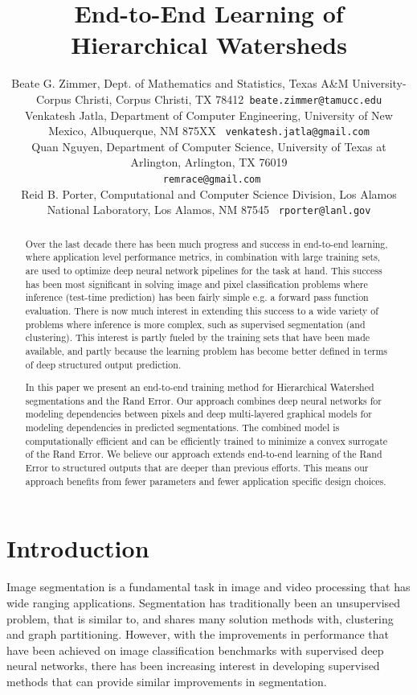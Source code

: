 \documentclass[letterpaper,twocolumn,fleqn]{article}
\title{End-to-End Learning of Hierarchical Watersheds}
\author{
 Beate G. Zimmer, Dept. of Mathematics and Statistics, Texas A\&M University-Corpus Christi, Corpus Christi, TX 78412\texttt{ beate.zimmer@tamucc.edu} \\
 Venkatesh Jatla, Department of Computer Engineering, University of New Mexico, Albuquerque, NM 875XX \texttt{ venkatesh.jatla@gmail.com} \\
 Quan Nguyen, Department of Computer Science, University of Texas at Arlington, Arlington, TX 76019 \\\texttt{ remrace@gmail.com} \\
 Reid B. Porter, Computational and Computer Science Division, Los Alamos National Laboratory, Los Alamos, NM 87545 \texttt{ rporter@lanl.gov}
  }
\date{} %
\begin{document}
 

\maketitle 

\thispagestyle{empty} %


\begin{abstract}

Over the last decade there has been much progress and success in end-to-end learning, where application level performance metrics, in combination with large training sets, are used to optimize deep neural network pipelines for the task at hand. This success has been most significant in solving image and pixel classification problems where inference (test-time prediction) has been fairly simple e.g. a forward pass function evaluation. There is now much interest  in extending this success to a wide variety of problems where inference is more complex, such as supervised segmentation (and clustering). This interest is partly fueled by the training sets that have been made available, and partly because the learning problem has become better defined in terms of deep structured output prediction. 

In this paper we present an end-to-end training method for Hierarchical Watershed segmentations and the Rand Error. Our approach combines deep neural networks for modeling dependencies between pixels and deep multi-layered graphical models for modeling dependencies in predicted segmentations. The combined model is computationally efficient and can be efficiently trained to minimize a convex surrogate of the Rand Error. We believe our approach extends end-to-end learning of the Rand Error to structured outputs that are deeper than previous efforts. This means our approach benefits from fewer parameters and fewer application specific design choices.
\end{abstract}




\section{Introduction}

Image segmentation is a fundamental task in image and video processing that has wide ranging applications. Segmentation has traditionally been an unsupervised problem, that is similar to, and shares many solution methods with, clustering and graph partitioning. However, with the improvements in performance that have been achieved on image classification benchmarks with supervised deep neural networks, there has been increasing interest in developing supervised methods that can provide similar improvements in segmentation. 
\end{document}
